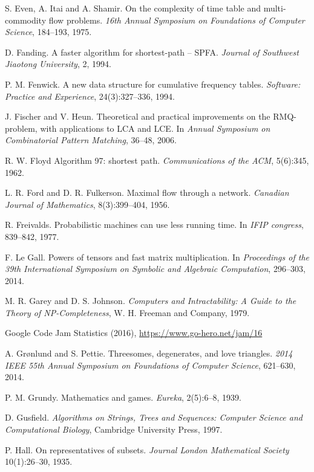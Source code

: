 \begin{thebibliography}{9}
  S. Even, A. Itai and A. Shamir.
  On the complexity of time table and multi-commodity flow problems.
  \emph{16th Annual Symposium on Foundations of Computer Science}, 184--193, 1975.

  D. Fanding.
  A faster algorithm for shortest-path -- SPFA.
  \emph{Journal of Southwest Jiaotong University}, 2, 1994.

  P. M. Fenwick.
  A new data structure for cumulative frequency tables.
  \emph{Software: Practice and Experience}, 24(3):327--336, 1994.

  J. Fischer and V. Heun.
  Theoretical and practical improvements on the RMQ-problem, with applications to LCA and LCE.
  In \emph{Annual Symposium on Combinatorial Pattern Matching}, 36--48, 2006.

  R. W. Floyd
  Algorithm 97: shortest path.
  \emph{Communications of the ACM}, 5(6):345, 1962.

  L. R. Ford and D. R. Fulkerson.
  Maximal flow through a network.
  \emph{Canadian Journal of Mathematics}, 8(3):399--404, 1956.

  R. Freivalds.
  Probabilistic machines can use less running time.
  In \emph{IFIP congress}, 839--842, 1977.

  F. Le Gall.
  Powers of tensors and fast matrix multiplication.
  In \emph{Proceedings of the 39th International Symposium on Symbolic and Algebraic Computation},
  296--303, 2014.

  M. R. Garey and D. S. Johnson.
  \emph{Computers and Intractability:
  A Guide to the Theory of NP-Completeness},
  W. H. Freeman and Company, 1979.

  Google Code Jam Statistics (2016),
  \url{https://www.go-hero.net/jam/16}

  A. Grønlund and S. Pettie.
  Threesomes, degenerates, and love triangles.
  \emph{2014 IEEE 55th Annual Symposium on Foundations of Computer Science},
  621--630, 2014.

  P. M. Grundy.
  Mathematics and games.
  \emph{Eureka}, 2(5):6--8, 1939.

  D. Gusfield.
  \emph{Algorithms on Strings, Trees and Sequences:
  Computer Science and Computational Biology},
  Cambridge University Press, 1997.

  P. Hall.
  On representatives of subsets.
  \emph{Journal London Mathematical Society} 10(1):26--30, 1935.


\end{thebibliography}

